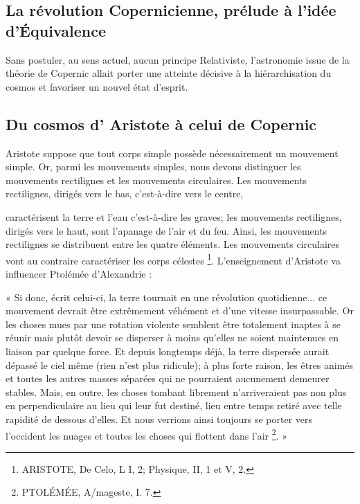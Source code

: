 \subsection{La révolution Copernicienne, prélude à l’idée d’Équivalence}

Sans postuler, au sens actuel, aucun principe Relativiste, l’astronomie
issue de la théorie de Copernic allait porter une atteinte décisive à la
hiérarchisation du cosmos et favoriser un nouvel état d’esprit.

\subsection{Du cosmos d’ Aristote à celui de Copernic}

Aristote suppose que tout corps simple possède nécessairement un
mouvement simple. Or, parmi les mouvements simples, nous devons
distinguer les mouvements rectilignes et les mouvements circulaires. Les
mouvements rectilignes, dirigés vers le bas, c’est-à-dire vers le centre,


caractérisent la terre et l’eau c’est-à-dire les graves; les mouvements
rectilignes, dirigés vers le haut, sont l’apanage de l’air et du feu. Ainsi,
les mouvements rectilignes se distribuent entre les quatre éléments. Les
mouvements circulaires vont au contraire caractériser les corps célestes \footnote{ARISTOTE, De Celo, L I, 2; Physique, II, 1 et V, 2.}.
L’enseignement d’Aristote va influencer Ptolémée d’Alexandrie :

« Si donc, écrit celui-ci, la terre tournait en une révolution quotidienne...
ce mouvement devrait être extrêmement véhément et d’une
vitesse insurpassable. Or les choses mues par une rotation violente
semblent être totalement inaptes à se réunir mais plutôt devoir se disperser
à moins qu’elles ne soient maintenues en liaison par quelque force.
Et depuis longtemps déjà, la terre dispersée aurait dépassé le ciel même
(rien n’est plus ridicule); à plus forte raison, les êtres animés et toutes les
autres masses séparées qui ne pourraient aucunement demeurer stables.
Mais, en outre, les choses tombant librement n’arriveraient pas non plus
en perpendiculaire au lieu qui leur fut destiné, lieu entre temps retiré
avec telle rapidité de dessous d’elles. Et nous verrions ainsi toujours se
porter vers l’occident les nuages et toutes les choses qui flottent dans
l’air \footnote{PTOLÉMÉE, A/mageste, I. 7.}. »

